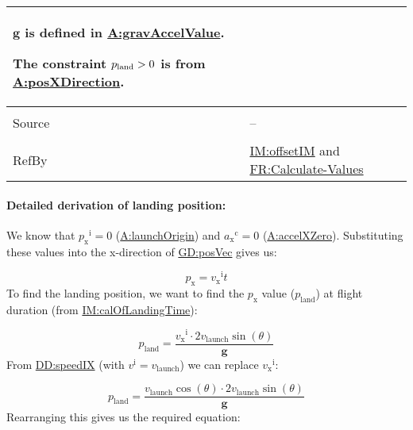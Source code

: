 \documentclass[12pt]{article}
\newcommand{\gt}{\ensuremath >}
\begin{document}
\begin{minipage}{\textwidth}
\begin{tabular}{>{\raggedright}p{}>{\raggedright\arraybackslash}p{}}
        $\mathbf{g}$ is defined in \hyperref[gravAccelValue]{A:gravAccelValue}.
        
        The constraint ${p_{\text{land}}}\gt{}0$ is from \hyperref[posXDirection]{A:posXDirection}.
        
\\ \midrule \\
Source & --
         
\\ \midrule \\
RefBy & \hyperref[IM:offsetIM]{IM:offsetIM} and \hyperref[calcValues]{FR:Calculate-Values}
        
\\ \bottomrule
\end{tabular}
\end{minipage}
\paragraph{Detailed derivation of landing position:}
\label{IM:calOfLandingDistDeriv}
We know that ${{p_{\text{x}}}^{\text{i}}}=0$ (\hyperref[launchOrigin]{A:launchOrigin}) and ${{a_{\text{x}}}^{\text{c}}}=0$ (\hyperref[accelXZero]{A:accelXZero}). Substituting these values into the x-direction of \hyperref[GD:posVec]{GD:posVec} gives us:

\begin{displaymath}
{p_{\text{x}}}={{v_{\text{x}}}^{\text{i}}} t
\end{displaymath}
To find the landing position, we want to find the ${p_{\text{x}}}$ value (${p_{\text{land}}}$) at flight duration (from \hyperref[IM:calOfLandingTime]{IM:calOfLandingTime}):

\begin{displaymath}
{p_{\text{land}}}=\frac{{{v_{\text{x}}}^{\text{i}}}\cdot{}2 {v_{\text{launch}}} \sin\left(θ\right)}{\mathbf{g}}
\end{displaymath}
From \hyperref[DD:speedIX]{DD:speedIX} (with ${v^{\text{i}}}={v_{\text{launch}}}$) we can replace ${{v_{\text{x}}}^{\text{i}}}$:

\begin{displaymath}
{p_{\text{land}}}=\frac{{v_{\text{launch}}} \cos\left(θ\right)\cdot{}2 {v_{\text{launch}}} \sin\left(θ\right)}{\mathbf{g}}
\end{displaymath}
Rearranging this gives us the required equation:
\end{document}
